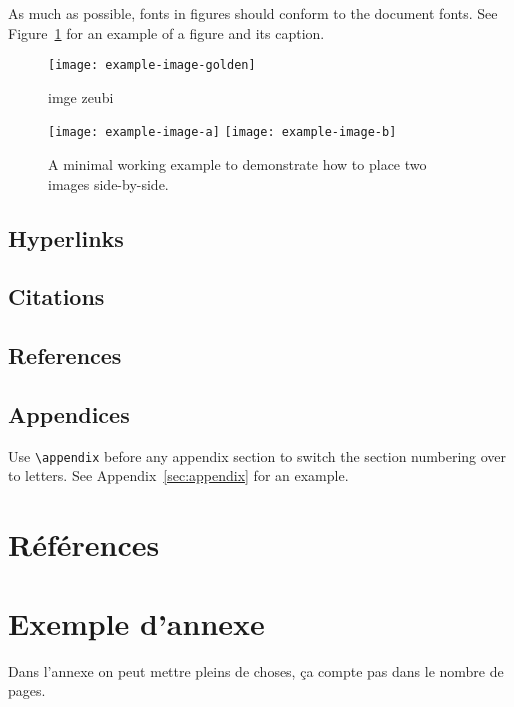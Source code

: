 \documentclass[11pt]{article}
\begin{document}
As much as possible, fonts in figures should conform
to the document fonts. See Figure~\ref{fig:experiments} for an example of a figure and its caption.

\begin{figure}[t]
  \texttt{[image: example-image-golden]}
  \caption{imge zeubi}
  \label{fig:experiments}
\end{figure}

\begin{figure*}[t]
  \texttt{[image: example-image-a]} \hfill
  \texttt{[image: example-image-b]}
  \caption {A minimal working example to demonstrate how to place
    two images side-by-side.}
\end{figure*}

\subsection{Hyperlinks}


\subsection{Citations}


\subsection{References}

\subsection{Appendices}

Use \verb|\appendix| before any appendix section to switch the section numbering over to letters. See Appendix~\ref{sec:appendix} for an example.

\section{Références}

\cite{forest2009variation}

\appendix

\section{Exemple d'annexe}
Dans l'annexe on peut mettre pleins de choses, ça compte pas dans le nombre de pages.
\end{document}
